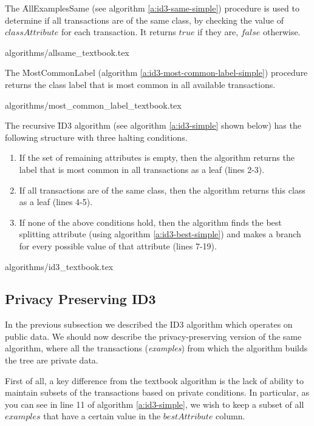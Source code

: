 The \f{AllExamplesSame} (see algorithm \ref{a:id3-same-simple}) procedure is used to determine if all transactions are of the same class, by checking the value of $classAttribute$ for each transaction.
It returns $true$ if they are, $false$ otherwise.

{algorithms/allsame_textbook.tex}

The \f{MostCommonLabel} (algorithm \ref{a:id3-most-common-label-simple}) procedure returns the class label that is most common in all available transactions.

{algorithms/most_common_label_textbook.tex}

The recursive \f{ID3} algorithm (see algorithm \ref{a:id3-simple} shown below) has the following structure with three halting conditions.
\begin{enumerate}
  \item If the set of remaining attributes is empty, then the algorithm returns the label that is most common in all transactions as a leaf (lines 2-3).
  \item If all transactions are of the same class, then the algorithm returns this class as a leaf (lines 4-5).
  \item If none of the above conditions hold, then the algorithm finds the best splitting attribute (using algorithm \ref{a:id3-best-simple}) and makes a branch for every possible value of that attribute (lines 7-19).
\end{enumerate}

{algorithms/id3_textbook.tex}



\subsection{Privacy Preserving ID3}\label{s:pp-id3}

In the previous subsection we described the ID3 algorithm which operates on public data.
We should now describe the privacy\hyp preserving version of the same algorithm, where all the transactions (\textit{examples}) from which the algorithm builds the tree are private data.

First of all, a key difference from the textbook algorithm is the lack of ability to maintain subsets of the transactions based on private conditions.
In particular, as you can see in line 11 of algorithm \ref{a:id3-simple}, we wish to keep a subset of all $examples$ that have a certain value in the $bestAttribute$
 column.

